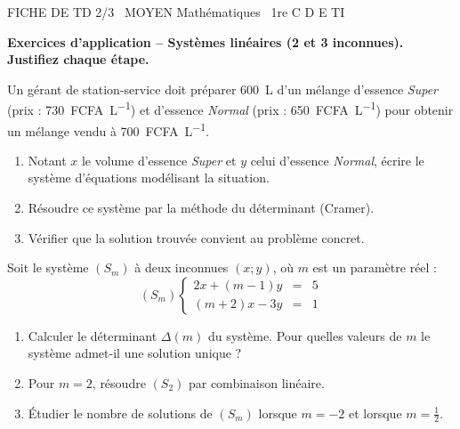 \documentclass[11pt]{article}
\begin{document}
\begin{tcolorbox}[enhanced,colback=popink,colframe=popink,arc=10pt,boxrule=0pt,left=12pt,right=12pt,top=9pt,bottom=9pt]
{\color{white}\popxbold\small FICHE DE TD 2/3 \textbullet\ MOYEN \hfill Mathématiques \textbullet\ 1re C D E TI\par}
\end{tcolorbox}
\vspace{4pt}
\textbf{Exercices d'application -- Systèmes linéaires (2 et 3 inconnues). Justifiez chaque étape.}

\begin{exercice}
Un gérant de station-service doit préparer \SI{600}{\liter} d'un mélange d'essence \textit{Super} (prix : \SI{730}{{FCFA}\per\liter}) et d'essence \textit{Normal} (prix : \SI{650}{{FCFA}\per\liter}) pour obtenir un mélange vendu à \SI{700}{{FCFA}\per\liter}.
\begin{enumerate}
    \item Notant $x$ le volume d'essence \textit{Super} et $y$ celui d'essence \textit{Normal}, écrire le système d'équations modélisant la situation.
    \item Résoudre ce système par la méthode du déterminant (Cramer).
    \item Vérifier que la solution trouvée convient au problème concret.
\end{enumerate}
\end{exercice}

\begin{exercice}
Soit le système $(S_m)$ à deux inconnues $(x;y)$, où $m$ est un paramètre réel :
\[
(S_m)\left\{
\begin{array}{rcl}
2x + (m-1)y &=& 5 \\
(m+2)x - 3y &=& 1
\end{array}
\right.
\]
\begin{enumerate}
    \item Calculer le déterminant $\Delta(m)$ du système. Pour quelles valeurs de $m$ le système admet-il une solution unique ?
    \item Pour $m=2$, résoudre $(S_2)$ par combinaison linéaire.
    \item Étudier le nombre de solutions de $(S_m)$ lorsque $m=-2$ et lorsque $m=\frac{1}{2}$.
\end{enumerate}
\end{exercice}
\end{document}
